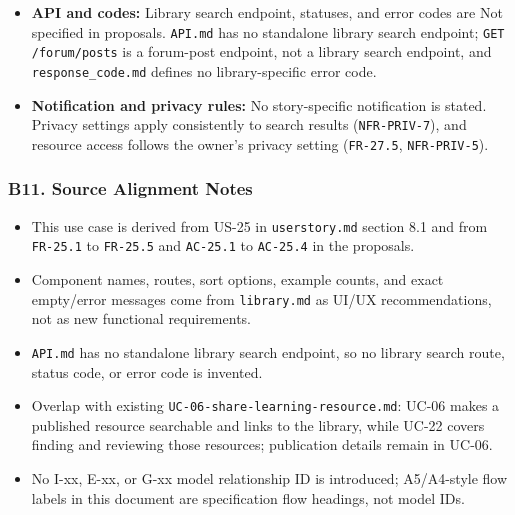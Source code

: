 \documentclass[12pt]{article}
\begin{document}
\begin{itemize}
\item \textbf{API and codes:} Library search endpoint, statuses, and error codes are Not specified in proposals. \texttt{API.md} has no standalone library search endpoint; \texttt{GET /forum/posts} is a forum-post endpoint, not a library search endpoint, and \texttt{response\_code.md} defines no library-specific error code.
\item \textbf{Notification and privacy rules:} No story-specific notification is stated. Privacy settings apply consistently to search results (\texttt{NFR-PRIV-7}), and resource access follows the owner's privacy setting (\texttt{FR-27.5}, \texttt{NFR-PRIV-5}).
\end{itemize}
\par\medskip

\hypertarget{sec:b11-source-alignment-notes}{}
\subsubsection*{B11. Source Alignment Notes}
\par\medskip

\begin{itemize}
\item This use case is derived from US-25 in \texttt{userstory.md} section 8.1 and from \texttt{FR-25.1} to \texttt{FR-25.5} and \texttt{AC-25.1} to \texttt{AC-25.4} in the proposals.
\item Component names, routes, sort options, example counts, and exact empty/error messages come from \texttt{library.md} as UI/UX recommendations, not as new functional requirements.
\item \texttt{API.md} has no standalone library search endpoint, so no library search route, status code, or error code is invented.
\item Overlap with existing \texttt{UC-06-share-learning-resource.md}: UC-06 makes a published resource searchable and links to the library, while UC-22 covers finding and reviewing those resources; publication details remain in UC-06.
\item No I-xx, E-xx, or G-xx model relationship ID is introduced; A5/A4-style flow labels in this document are specification flow headings, not model IDs.
\end{itemize}
\par\medskip

\par\medskip
\hypertarget{sec:ui-prototype-specimens}{}
\end{document}
